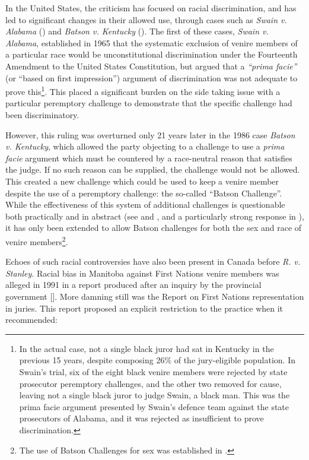 In the United States, the criticism has focused on racial discrimination, and has led to significant changes in their allowed use,
through cases such as \textit{Swain v. Alabama} (\cite{swainvalabama}) and \textit{Batson v. Kentucky}
(\cite{batsonvkentucky}). The first of these cases, \textit{Swain v. Alabama}, established in 1965 that the systematic exclusion
of venire members of a particular race would be unconstitutional discrimination under the Fourteenth Amendment to the United
States Constitution, but argued that a \textit{``prima facie''} (or ``based on first impression'') argument of discrimination was
not adequate to prove this\footnote{In the actual case, not a single black juror had sat in Kentucky in the previous 15 years,
  despite composing 26\% of the jury-eligible population. In Swain's trial, six of the eight black venire members were rejected by
  state prosecutor peremptory challenges, and the other two removed for cause, leaving not a single black juror to judge Swain, a
  black man. This was the prima facie argument presented by Swain's defence team against the state prosecutors of Alabama, and it
  was rejected as insufficient to prove discrimination.}. This placed a significant burden on the side taking issue with a
particular peremptory challenge to demonstrate that the specific challenge had been discriminatory.

However, this ruling was overturned only 21 years later in the 1986 case \textit{Batson v. Kentucky}, which allowed the
party objecting to a challenge to use a \textit{prima facie} argument which must be countered by a race-neutral reason that
satisfies the judge. If no such reason can be supplied, the challenge would not be allowed. This created a new challenge which
could be used to keep a venire member despite the use of a peremptory challenge: the so-called ``Batson Challenge''. While the
effectiveness of this system of additional challenges is questionable both practically and in abstract (see \cite{page2005} and
\cite{morehead1994}, and a particularly strong response in \cite{hoffman1997}), it has only been extended to allow Batson
challenges for both the sex and race of venire members\footnote{The use of Batson Challenges for sex was established in
  \cite{jebvalabama}.}.

Echoes of such racial controversies have also been present in Canada before \textit{R. v. Stanley}. Racial bias in Manitoba
against First Nations venire members was alleged in 1991 in a report produced after an inquiry by the provincial government
[\cite{goodfirststep}]. More damning still was the \citeauthor{iacobuccireport} Report on First Nations representation in
juries. This report proposed an explicit restriction to the practice when it recommended:

